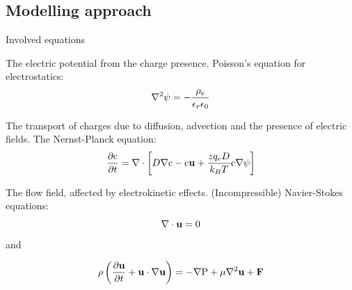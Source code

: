 \subsection{Modelling approach}

\begin{frame}{Involved equations}

\begin{itemize*}

\item The electric potential from the charge presence. Poisson's
  equation for electrostatics:
\begin{equation}\label{eq:pb}
\nabla^2\psirm = -\frac{\rho_e}{\epsilon_r \epsilon_0}
\end{equation}


\item The transport of charges due to diffusion, advection and the
  presence of electric fields. The Nernst-Planck equation:
\begin{equation}\label{eq:et:np}
\dfrac{\partial \C}{\partial t} = \nabla \cdot \left [
 D\nabla \C - \C\ubf + \frac{zq_eD}{k_BT}\C\nabla\psirm
\right]
\end{equation}

\item The flow field, affected by electrokinetic
  effects. (Incompressible) Navier-Stokes equations:
\begin{equation}\label{eq:et:ns_incompressible}
 \nabla \cdot \ubf = 0
\end{equation}
and

\begin{equation}\label{eq:et:ns_mom}
\rhorm \left (\dfrac{\partial \ubf}{\partial t} +
  \ubf \cdot \nabla \ubf 
  \right ) = - \nabla \Prm  + \mu \nabla^2 \ubf + \F
\end{equation}


\end{itemize*}

\end{frame}

